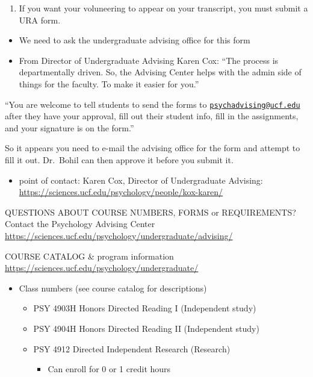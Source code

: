\documentclass[
]{book}
\providecommand{\tightlist}{%
  \setlength{\itemsep}{0pt}\setlength{\parskip}{0pt}}
\begin{document}
\begin{enumerate}
\def\labelenumi{\arabic{enumi}.}
\setcounter{enumi}{1}
\tightlist
\item
  If you want your voluneering to appear on your transcript, you must submit a URA form.
\end{enumerate}

\begin{itemize}
\tightlist
\item
  We need to ask the undergraduate advising office for this form
\item
  From Director of Undergraduate Advising Karen Cox: ``The process is departmentally driven. So, the Advising Center helps with the admin side of things for the faculty. To make it easier for you.''
\end{itemize}

``You are welcome to tell students to send the forms to \href{mailto:psychadvising@ucf.edu}{\nolinkurl{psychadvising@ucf.edu}} after they have your approval, fill out their student info, fill in the assignments, and your signature is on the form.''

So it appears you need to e-mail the advising office for the form and attempt to fill it out. Dr.~Bohil can then approve it before you submit it.

\begin{itemize}
\tightlist
\item
  point of contact: Karen Cox, Director of Undergraduate Advising:
  \url{https://sciences.ucf.edu/psychology/people/kox-karen/}
\end{itemize}

QUESTIONS ABOUT COURSE NUMBERS, FORMS or REQUIREMENTS?
Contact the Psychology Advising Center
\url{https://sciences.ucf.edu/psychology/undergraduate/advising/}

COURSE CATALOG \& program information
\url{https://sciences.ucf.edu/psychology/undergraduate/}

\begin{itemize}
\tightlist
\item
  Class numbers (see course catalog for descriptions)

  \begin{itemize}
  \tightlist
  \item
    PSY 4903H Honors Directed Reading I (Independent study)
  \item
    PSY 4904H Honors Directed Reading II (Independent study)
  \item
    PSY 4912 Directed Independent Research (Research)

    \begin{itemize}
    \tightlist
    \item
      Can enroll for 0 or 1 credit hours
    \end{itemize}
  \end{itemize}
\end{itemize}
\end{document}
